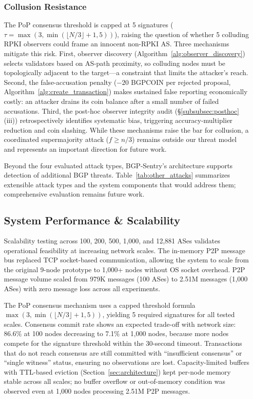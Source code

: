 \documentclass[conference]{IEEEtran}
\begin{document}
\subsubsection{Collusion Resistance}
\label{subsubsec:collusion}

The PoP consensus threshold is capped at 5 signatures ($\tau = \max(3, \min(\lfloor N/3 \rfloor + 1, 5))$), raising the question of whether 5 colluding RPKI observers could frame an innocent non-RPKI AS. Three mechanisms mitigate this risk. First, observer discovery (Algorithm~\ref{alg:observer_discovery}) selects validators based on AS-path proximity, so colluding nodes must be topologically adjacent to the target---a constraint that limits the attacker's reach. Second, the false-accusation penalty ($-20$ BGPCOIN per rejected proposal, Algorithm~\ref{alg:create_transaction}) makes sustained false reporting economically costly: an attacker drains its coin balance after a small number of failed accusations. Third, the post-hoc observer integrity audit (\S\ref{subsubsec:posthoc}(iii)) retrospectively identifies systematic bias, triggering accuracy-multiplier reduction and coin slashing. While these mechanisms raise the bar for collusion, a coordinated supermajority attack ($f \geq n/3$) remains outside our threat model and represents an important direction for future work.

Beyond the four evaluated attack types, BGP-Sentry's architecture supports detection of additional BGP threats. Table~\ref{tab:other_attacks} summarizes extensible attack types and the system components that would address them; comprehensive evaluation remains future work.


\subsection{System Performance \& Scalability}
\label{subsec:performance_scalability}

Scalability testing across 100, 200, 500, 1{,}000, and 12{,}881 ASes validates operational feasibility at increasing network scales. The in-memory P2P message bus replaced TCP socket-based communication, allowing the system to scale from the original 9-node prototype to 1{,}000+ nodes without OS socket overhead. P2P message volume scaled from 979K messages (100 ASes) to 2.51M messages (1{,}000 ASes) with zero message loss across all experiments.






The PoP consensus mechanism uses a capped threshold formula $\max(3, \min(\lfloor N/3 \rfloor + 1, 5))$, yielding 5 required signatures for all tested scales. Consensus commit rate shows an expected trade-off with network size: 86.6\% at 100 nodes decreasing to 7.1\% at 1{,}000 nodes, because more nodes compete for the signature threshold within the 30-second timeout. Transactions that do not reach consensus are still committed with ``insufficient consensus'' or ``single witness'' status, ensuring no observations are lost. Capacity-limited buffers with TTL-based eviction (Section~\ref{sec:architecture}) kept per-node memory stable across all scales; no buffer overflow or out-of-memory condition was observed even at 1{,}000 nodes processing 2.51M P2P messages.
\end{document}
